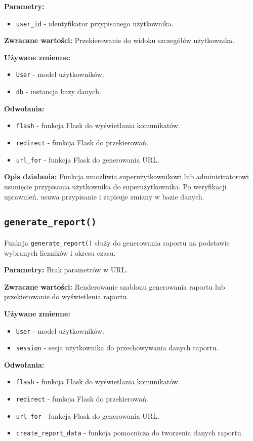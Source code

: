 \documentclass[12pt,a4paper]{report}
\begin{document}
\textbf{Parametry:}
\begin{itemize}
    \item \texttt{user\_id} - identyfikator przypisanego użytkownika.
\end{itemize}

\textbf{Zwracane wartości:} Przekierowanie do widoku szczegółów użytkownika.

\textbf{Używane zmienne:}
\begin{itemize}
    \item \texttt{User} - model użytkowników.
    \item \texttt{db} - instancja bazy danych.
\end{itemize}

\textbf{Odwołania:}
\begin{itemize}
    \item \texttt{flash} - funkcja Flask do wyświetlania komunikatów.
    \item \texttt{redirect} - funkcja Flask do przekierowań.
    \item \texttt{url\_for} - funkcja Flask do generowania URL.
\end{itemize}

\textbf{Opis działania:}
Funkcja umożliwia superużytkownikowi lub administratorowi usunięcie przypisania użytkownika do superużytkownika. Po weryfikacji uprawnień, usuwa przypisanie i zapisuje zmiany w bazie danych.

\subsection{\texttt{generate\_report()}}
\label{sec:generate_report}
Funkcja \texttt{generate\_report()} służy do generowania raportu na podstawie wybranych liczników i okresu czasu.

\textbf{Parametry:} Brak parametrów w URL.

\textbf{Zwracane wartości:} Renderowanie szablonu generowania raportu lub przekierowanie do wyświetlenia raportu.

\textbf{Używane zmienne:}
\begin{itemize}
    \item \texttt{User} - model użytkowników.
    \item \texttt{session} - sesja użytkownika do przechowywania danych raportu.
\end{itemize}

\textbf{Odwołania:}
\begin{itemize}
    \item \texttt{flash} - funkcja Flask do wyświetlania komunikatów.
    \item \texttt{redirect} - funkcja Flask do przekierowań.
    \item \texttt{url\_for} - funkcja Flask do generowania URL.
    \item \texttt{create\_report\_data} - funkcja pomocnicza do tworzenia danych raportu.
\end{itemize}
\end{document}
